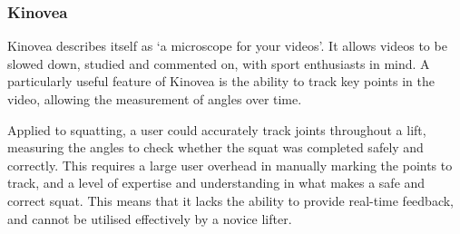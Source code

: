 \subsubsection{Kinovea}

Kinovea\cite{kinovea} describes itself as `a microscope for your videos'. It allows videos to be slowed down, studied and commented on, with sport enthusiasts in mind. A particularly useful feature of Kinovea is the ability to track key points in the video, allowing the measurement of angles over time. 

Applied to squatting, a user could accurately track joints throughout a lift, measuring the angles to check whether the squat was completed safely and correctly. This requires a large user overhead in manually marking the points to track, and a level of expertise and understanding in what makes a safe and correct squat. This means that it lacks the ability to provide real-time feedback, and cannot be utilised effectively by a novice lifter.